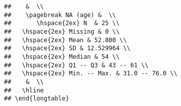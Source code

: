 \documentclass{article}\usepackage[]{graphicx}\usepackage[]{color}
\makeatletter
\newenvironment{kframe}{%
 \def\at@end@of@kframe{}%
 \ifinner\ifhmode%
  \def\at@end@of@kframe{\end{minipage}}%
  \begin{minipage}{\columnwidth}%
 \fi\fi%
 \def\FrameCommand##1{\hskip\@totalleftmargin \hskip-\fboxsep
 \colorbox{shadecolor}{##1}\hskip-\fboxsep
     \hskip-\linewidth \hskip-\@totalleftmargin \hskip\columnwidth}%
 \MakeFramed {\advance\hsize-\width
   \@totalleftmargin\z@ \linewidth\hsize
   \@setminipage}}%
 {\par\unskip\endMakeFramed%
 \at@end@of@kframe}
\newenvironment{knitrout}{}{} %
\makeatother
\begin{document}
\begin{knitrout}
\begin{kframe}
\begin{verbatim}
##    &  \\ 
##    \pagebreak NA (age) &  \\ 
##       \hspace{2ex} N  & 25 \\ 
##   \hspace{2ex} Missing & 0 \\ 
##   \hspace{2ex} Mean & 52.800 \\ 
##   \hspace{2ex} SD & 12.529964 \\ 
##   \hspace{2ex} Median & 54 \\ 
##   \hspace{2ex} Q1 -- Q3 & 43 -- 61 \\ 
##   \hspace{2ex} Min. -- Max. & 31.0 -- 76.0 \\ 
##    &  \\ 
##   \hline
## \end{longtable}
\end{verbatim}
\end{kframe}
\end{knitrout}
\end{document}
